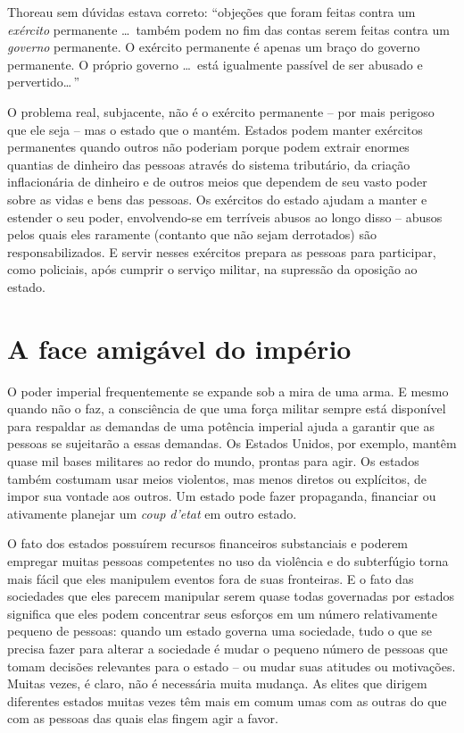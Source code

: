 Thoreau sem dúvidas estava correto: ``objeções que foram feitas contra um \emph{exército} permanente \ldots\ também podem no fim das contas serem feitas contra um \emph{governo} permanente. O exército permanente é apenas um braço do governo permanente. O próprio governo \ldots\ está igualmente passível de ser abusado e pervertido\ldots\,''

O problema real, subjacente, não é o exército permanente -- por mais perigoso que ele seja -- mas o estado que o mantém. Estados podem manter exércitos permanentes quando outros não poderiam porque podem extrair enormes quantias de dinheiro das pessoas através do sistema tributário, da criação inflacionária de dinheiro e de outros meios que dependem de seu vasto poder sobre as vidas e bens das pessoas. Os exércitos do estado ajudam a manter e estender o seu poder, envolvendo-se em terríveis abusos ao longo disso -- abusos pelos quais eles raramente (contanto que não sejam derrotados) são responsabilizados. E servir nesses exércitos prepara as pessoas para participar, como policiais, após cumprir o serviço militar, na supressão da oposição ao estado.

\section{A face amigável do império}

O poder imperial frequentemente se expande sob a mira de uma arma. E mesmo quando não o faz, a consciência de que uma força militar sempre está disponível para respaldar as demandas de uma potência imperial ajuda a garantir que as pessoas se sujeitarão a essas demandas. Os Estados Unidos, por exemplo, mantêm quase mil bases militares ao redor do mundo, prontas para agir. Os estados também costumam usar meios violentos, mas menos diretos ou explícitos, de impor sua vontade aos outros. Um estado pode fazer propaganda, financiar ou ativamente planejar um \emph{coup d'etat} em outro estado.

O fato dos estados possuírem recursos financeiros substanciais e poderem empregar muitas pessoas competentes no uso da violência e do subterfúgio torna mais fácil que eles manipulem eventos fora de suas fronteiras. E o fato das sociedades que eles parecem manipular serem quase todas governadas por estados significa que eles podem concentrar seus esforços em um número relativamente pequeno de pessoas: quando um estado governa uma sociedade, tudo o que se precisa fazer para alterar a sociedade é mudar o pequeno número de pessoas que tomam decisões relevantes para o estado -- ou mudar suas atitudes ou motivações. Muitas vezes, é claro, não é necessária muita mudança. As elites que dirigem diferentes estados muitas vezes têm mais em comum umas com as outras do que com as pessoas das quais elas fingem agir a favor.

